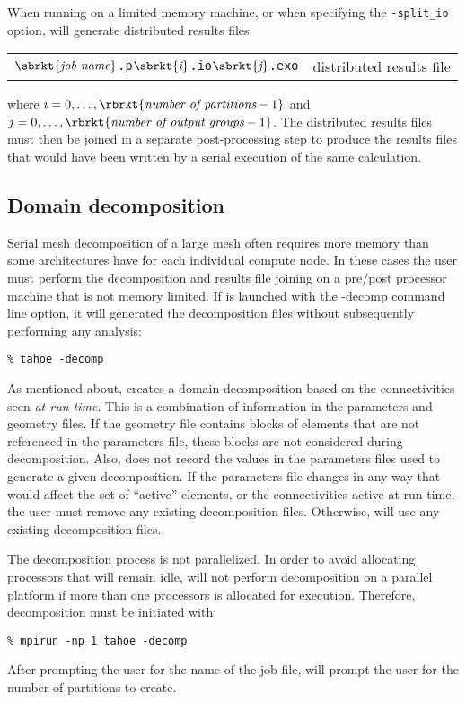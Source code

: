 When running on a limited memory machine, or when specifying the 
\texttt{-split\_io}
option, \tahoe will generate distributed results files:
\begin{center}
\begin{tabular}[c]{c c}
 \parbox[b]{3.0in}{\raggedleft $\sbrkt{\textit{job name}}$\texttt{.p}$\sbrkt{\textit{i}}$\texttt{.io}$\sbrkt{\textit{j}}$\texttt{.exo}}
&\parbox[b]{3.0in}{distributed results file}
\end{tabular}
\end{center}
where $i = 0,\ldots,\rbrkt{\textit{number of partitions} - 1}$ and 
$j = 0,\ldots,\rbrkt{\textit{number of output groups} - 1}$.
The distributed results files must then be joined in a
separate post-processing step to produce the results files that would have
been written by a serial execution of the same calculation.

\subsection{Domain decomposition}
\label{sect.domain.decomp}
Serial mesh decomposition of a large mesh often requires more memory than
some architectures have for each individual compute node.  In these cases
the user must perform the decomposition and results file joining on a
pre/post processor machine that is not memory limited.  If \tahoe is
launched with the -decomp command line option, it will generated the
decomposition files without subsequently performing any analysis:
\begin{center}
\texttt{\% tahoe -decomp}
\end{center}
As mentioned about, \tahoe creates a domain decomposition based on the
connectivities seen \emph{at run time}.  This is a combination of information in
the parameters and geometry files.  If the geometry file contains blocks of
elements that are not referenced in the parameters file, these blocks are
not considered during decomposition.  Also, \tahoe does not record the
values in the parameters files used to generate a given decomposition.  If
the parameters file changes in any way that would affect the set of
``active'' elements, or the connectivities active at run time, the user must
remove any existing decomposition files.  Otherwise, \tahoe will use any
existing decomposition files.

The decomposition process is not parallelized.  In order to avoid
allocating processors that will remain idle, \tahoe will not perform
decomposition on a parallel platform if more than one processors is
allocated for execution.  Therefore, decomposition must be initiated 
with:
\begin{center}
\texttt{\% mpirun -np 1 tahoe -decomp}
\end{center}
After prompting the user for the name of the job file, \tahoe will prompt
the user for the number of partitions to create.

